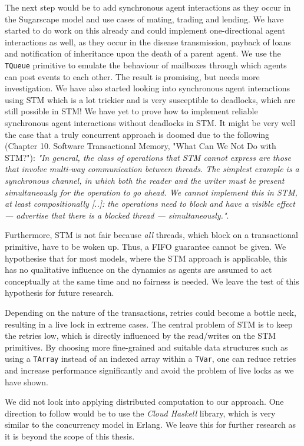 The next step would be to add synchronous agent interactions as they occur in the Sugarscape model and use cases of mating, trading and lending. We have started to do work on this already and could implement one-directional agent interactions as well, as they occur in the disease transmission, payback of loans and notification of inheritance upon the death of a parent agent. We use the \texttt{TQueue} primitive to emulate the behaviour of mailboxes through which agents can post events to each other. The result is promising, but needs more investigation. We have also started looking into synchronous agent interactions using STM which is a lot trickier and is very susceptible to deadlocks, which are still possible in STM! We have yet to prove how to implement reliable synchronous agent interactions without deadlocks in STM. It might be very well the case that a truly concurrent approach is doomed due to the following \cite{marlow_parallel_2013} (Chapter 10. Software Transactional Memory, "What Can We Not Do with STM?"): \textit{"In general, the class of operations that STM cannot express are those that involve multi-way communication between threads. The simplest example is a synchronous channel, in which both the reader and the writer must be present simultaneously for the operation to go ahead. We cannot implement this in STM, at least compositionally [..]: the operations need to block and have a visible effect — advertise that there is a blocked thread — simultaneously."}. 

Furthermore, STM is not fair because \textit{all} threads, which block on a transactional primitive, have to be woken up. Thus, a FIFO guarantee cannot be given. We hypothesise that for most models, where the STM approach is applicable, this has no qualitative influence on the dynamics as agents are assumed to act conceptually at the same time and no fairness is needed. We leave the test of this hypothesis for future research.

Depending on the nature of the transactions, retries could become a bottle neck, resulting in a live lock in extreme cases. The central problem of STM is to keep the retries low, which is directly influenced by the read/writes on the STM primitives. By choosing more fine-grained and suitable data structures such as using a \texttt{TArray} instead of an indexed array within a \texttt{TVar}, one can reduce retries and increase performance significantly and avoid the problem of live locks as we have shown.

We did not look into applying distributed computation to our approach. One direction to follow would be to use the \textit{Cloud Haskell} library, which is very similar to the concurrency model in Erlang. We leave this for further research as it is beyond the scope of this thesis.

